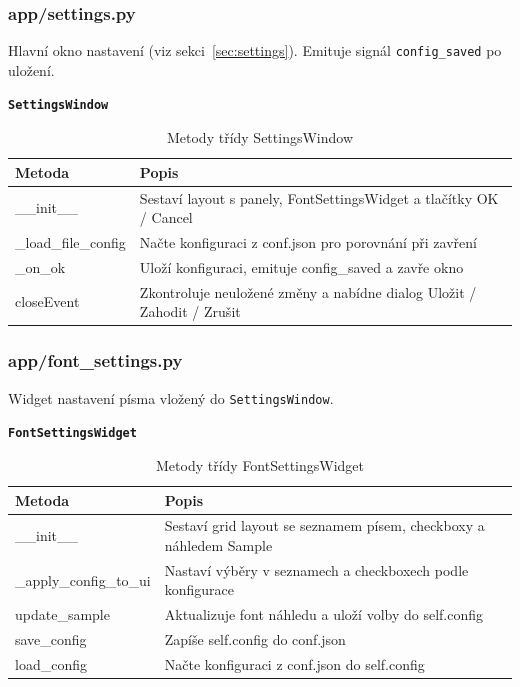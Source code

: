 \documentclass[FM,Proj]{tulthesis}
\begin{document}
\subsubsection{app/settings.py}

Hlavní okno nastavení (viz sekci~\ref{sec:settings}). Emituje signál
\texttt{config\_saved} po uložení.

\textbf{\texttt{SettingsWindow}}

\begin{table}[H]
	\centering
	\caption{Metody třídy SettingsWindow}
	\begin{tabularx}{\textwidth}{|l|X|}
		\hline
		\textbf{Metoda} & \textbf{Popis} \\ \hline
		\_\_init\_\_          & Sestaví layout s panely, FontSettingsWidget a tlačítky OK / Cancel \\ \hline
		\_load\_file\_config  & Načte konfiguraci z conf.json pro porovnání při zavření \\ \hline
		\_on\_ok              & Uloží konfiguraci, emituje config\_saved a zavře okno \\ \hline
		closeEvent            & Zkontroluje neuložené změny a nabídne dialog Uložit / Zahodit / Zrušit \\ \hline
	\end{tabularx}
	\label{tab:settingswindow}
\end{table}

\subsubsection{app/font\_settings.py}

Widget nastavení písma vložený do \texttt{SettingsWindow}.

\textbf{\texttt{FontSettingsWidget}}

\begin{table}[H]
	\centering
	\caption{Metody třídy FontSettingsWidget}
	\begin{tabularx}{\textwidth}{|l|X|}
		\hline
		\textbf{Metoda} & \textbf{Popis} \\ \hline
		\_\_init\_\_            & Sestaví grid layout se seznamem písem, checkboxy a náhledem Sample \\ \hline
		\_apply\_config\_to\_ui & Nastaví výběry v seznamech a checkboxech podle konfigurace \\ \hline
		update\_sample          & Aktualizuje font náhledu a uloží volby do self.config \\ \hline
		save\_config            & Zapíše self.config do conf.json \\ \hline
		load\_config            & Načte konfiguraci z conf.json do self.config \\ \hline
	\end{tabularx}
	\label{tab:fontsettingswidget}
\end{table}
		
\end{document}
